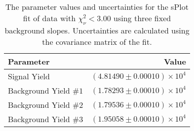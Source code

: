 
\begin{table}[ht]
    \begin{center}
        \begin{tabular}{lr}\toprule
            Parameter & Value \\\midrule
            Signal Yield & $(4.81490 \pm 0.00010) \times 10^{4}$ \\
            Background Yield $\#1$ & $(1.78293 \pm 0.00010) \times 10^{4}$ \\
            Background Yield $\#2$ & $(1.79536 \pm 0.00010) \times 10^{4}$ \\
            Background Yield $\#3$ & $(1.95058 \pm 0.00010) \times 10^{4}$ \\\bottomrule
        \end{tabular}
        \caption{The parameter values and uncertainties for the sPlot fit of data with $\chi^2_\nu < 3.00$ using three fixed background slopes. Uncertainties are calculated using the covariance matrix of the fit.}\label{tab:splot-fit-results-chisqdof-3.00-fixed-3}
    \end{center}
\end{table}
